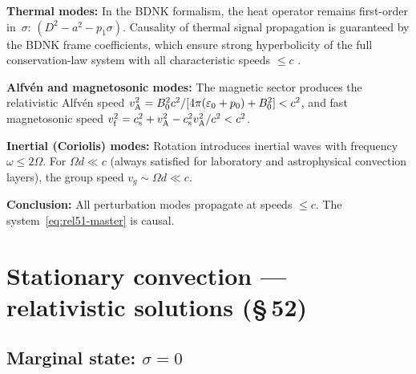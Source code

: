 \begin{causalitycheck}
\textbf{Thermal modes:} In the BDNK formalism, the heat operator
remains first-order in~$\sigma$: $(D^{2}-a^{2}-p_{1}\sigma)$.
Causality of thermal signal propagation is guaranteed by the BDNK
frame coefficients, which ensure strong hyperbolicity of the full
conservation-law system with all characteristic speeds $\le c$
\citep{BemficaDN2018,Kovtun2019}.

\textbf{Alfv\'en and magnetosonic modes:} The magnetic sector
produces the relativistic Alfv\'en speed
$v_{\mathrm{A}}^{2} = B_{0}^{2}c^{2}/[4\pi(\varepsilon_{0}+p_{0})+B_{0}^{2}]
< c^{2}$,
and fast magnetosonic speed
$v_{\mathrm{f}}^{2} = c_{\mathrm{s}}^{2}+v_{\mathrm{A}}^{2}-c_{\mathrm{s}}^{2}v_{\mathrm{A}}^{2}/c^{2} < c^{2}$.

\textbf{Inertial (Coriolis) modes:} Rotation introduces inertial
waves with frequency $\omega \le 2\Omega$.  For $\Omega d \ll c$
(always satisfied for laboratory and astrophysical convection layers),
the group speed $v_{g} \sim \Omega d \ll c$.

\textbf{Conclusion:} All perturbation modes propagate at speeds
$\le c$.  The system~\eqref{eq:rel51-master} is causal.
\end{causalitycheck}


\section{Stationary convection --- relativistic solutions (\S\,52)}
\label{sec:rel-52}

\subsection{Marginal state: $\sigma = 0$}

